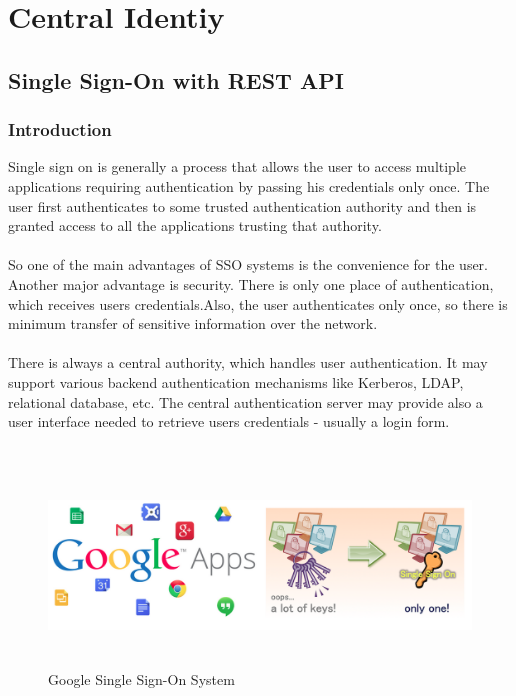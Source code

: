 \documentclass[12pt]{report}
\begin{document}
\chapter{Central Identiy}

\section{Single Sign-On with REST API}

\subsection{Introduction}
	Single sign on is generally a process that allows the user to access multiple 
applications requiring authentication by passing his credentials only once. The 
user first authenticates to some trusted authentication authority and then is 
granted access to all the applications trusting that authority.\\
\\
	So one of the main advantages of SSO systems is the convenience for the user. 
Another major advantage is security. There is only one place of authentication, 
which receives users credentials.Also, the user authenticates only once, so there is minimum transfer of sensitive information over the network.\\
\\
There is always a central authority, which handles user authentication. It may 
support various backend authentication mechanisms like Kerberos, LDAP, relational database, etc. The central authentication server may provide also a user interface needed to retrieve users credentials - usually a login form.\\
\\
\begin{figure}[H]
\includegraphics[width=15cm,height=5.3cm]{SSO}
\caption{Google Single Sign-On System\label{fig: Google Single Sign-On System}}
\end{figure}
\pagebreak
\end{document}
